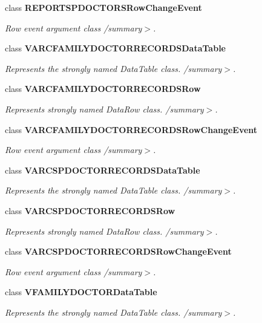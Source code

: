 \begin{CompactItemize}
class {\bf REPORTSPDOCTORSRowChangeEvent}
\begin{CompactList}\small\item\em Row event argument class /summary$>$. \item\end{CompactList}\item 
class {\bf VARCFAMILYDOCTORRECORDSDataTable}
\begin{CompactList}\small\item\em Represents the strongly named DataTable class. /summary$>$. \item\end{CompactList}\item 
class {\bf VARCFAMILYDOCTORRECORDSRow}
\begin{CompactList}\small\item\em Represents strongly named DataRow class. /summary$>$. \item\end{CompactList}\item 
class {\bf VARCFAMILYDOCTORRECORDSRowChangeEvent}
\begin{CompactList}\small\item\em Row event argument class /summary$>$. \item\end{CompactList}\item 
class {\bf VARCSPDOCTORRECORDSDataTable}
\begin{CompactList}\small\item\em Represents the strongly named DataTable class. /summary$>$. \item\end{CompactList}\item 
class {\bf VARCSPDOCTORRECORDSRow}
\begin{CompactList}\small\item\em Represents strongly named DataRow class. /summary$>$. \item\end{CompactList}\item 
class {\bf VARCSPDOCTORRECORDSRowChangeEvent}
\begin{CompactList}\small\item\em Row event argument class /summary$>$. \item\end{CompactList}\item 
class {\bf VFAMILYDOCTORDataTable}
\begin{CompactList}\small\item\em Represents the strongly named DataTable class. /summary$>$. \item\end{CompactList}\item 

\end{CompactItemize}
